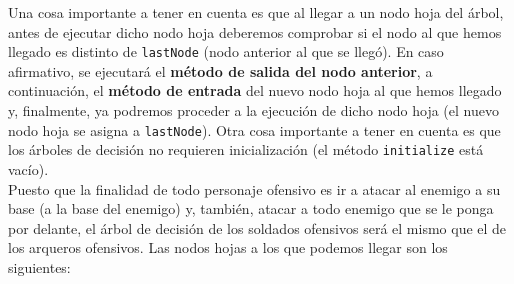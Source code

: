 Una cosa importante a tener en cuenta es que al llegar a un nodo hoja del árbol, antes de ejecutar dicho nodo hoja deberemos comprobar si el nodo al que hemos llegado es distinto de \texttt{lastNode} (nodo anterior al que se llegó). En caso afirmativo, se ejecutará el \textbf{método de salida del nodo anterior}, a continuación, el \textbf{método de entrada} del nuevo nodo hoja al que hemos llegado y, finalmente, ya podremos proceder a la ejecución de dicho nodo hoja (el nuevo nodo hoja se asigna a \texttt{lastNode}). Otra cosa importante a tener en cuenta es que los árboles de decisión no requieren inicialización (el método \texttt{initialize} está vacío). \\

Puesto que la finalidad de todo personaje ofensivo es ir a atacar al enemigo a su base (a la base del enemigo) y, también, atacar a todo enemigo que se le ponga por delante, el árbol de decisión de los soldados ofensivos será el mismo que el de los arqueros ofensivos. Las nodos hojas a los que podemos llegar son los siguientes:
